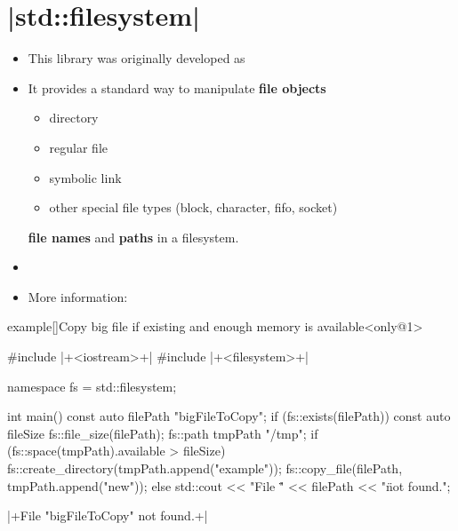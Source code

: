 \section{\CPP|std::filesystem|}
\begin{frame}[fragile]{\insertsectionhead}
    \vspace{-3mm}
    \begin{itemize}
        \item This library was originally developed as 
        \item It provides a standard way to manipulate \textbf{file objects}
              \begin{itemize}
                  \item directory
                  \item regular file
                  \item symbolic link
                  \item other special file types (block, character, fifo, socket)
              \end{itemize}
              \textbf{file names} and \textbf{paths} in a filesystem.
        \item {}
        \item More information: 
    \end{itemize}
\end{frame}
\begin{frame}[fragile]{}
    \begin{varblock}{example}[\textwidth]{Copy big file if existing and enough memory is available}<only@1>
        \begin{Cpp}
            #include |+<iostream>+|
            #include |+<filesystem>+|

            namespace fs = std::filesystem;

            int main()
            {
                const auto filePath {"bigFileToCopy"};
                if (fs::exists(filePath)) {
                    const auto fileSize {fs::file_size(filePath)};
                    fs::path tmpPath {"/tmp"};
                    if (fs::space(tmpPath).available > fileSize)
                    {
                        fs::create_directory(tmpPath.append("example"));
                        fs::copy_file(filePath, tmpPath.append("new"));
                    }
                } else
                    std::cout
                        << "File \"" << filePath << "\" not found.\n";
            }
        \end{Cpp}
        \begin{Bash}[numbers=none]
            |+File "bigFileToCopy" not found.+|
        \end{Bash}
    \end{varblock}
\end{frame}


